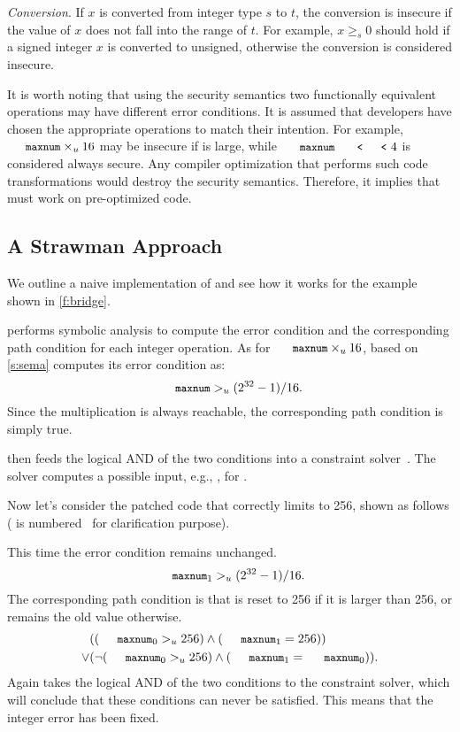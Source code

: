 \noindent
{\it Conversion}.
If $x$ is converted from integer type $s$ to $t$, the conversion
is insecure if the value of $x$ does not fall into the range of
$t$.  For example, $x \geq_s 0$ should hold if a signed integer $x$
is converted to unsigned, otherwise the conversion is considered
insecure.

It is worth noting that using the security semantics two functionally
equivalent operations may have different error conditions.  It is
assumed that developers have chosen the appropriate operations to
match their intention.  For example, $\cc{maxnum}\times_u 16$ may
be insecure if  is large, while $\cc{maxnum} \shl 4$ is
considered always secure.  Any compiler optimization that performs
such code transformations would destroy the security semantics.
Therefore, it implies that \sys must work on pre-optimized code.

\subsection{A Strawman Approach}

We outline a naive implementation of \sys and see how it works
for the example shown in \autoref{f:bridge}.

\sys performs symbolic analysis to compute the error condition and
the corresponding path condition for each integer operation.  As
for $\cc{maxnum} \times_u 16$, based on \autoref{s:sema}
\sys computes its error condition as:
\begin{equation*}
\cc{maxnum} >_u (2^{32} - 1) / 16.
\end{equation*}
Since the multiplication is always reachable, the corresponding
path condition is simply true.

\sys then feeds the logical AND of the two conditions into a
constraint solver~\cite{boolector}.  The solver computes a possible
input, e.g., , for .

Now let's consider the patched code that correctly limits 
to 256, shown as follows ( is
numbered~\cite[\chapterautorefname~8.11]{whale} for clarification
purpose).

This time the error condition remains unchanged.
\begin{equation*}
\cc{maxnum}_1 >_u (2^{32} - 1) / 16.
\end{equation*}
The corresponding path condition is that  is reset to 256
if it is larger than 256, or remains the old value otherwise.
\begin{align*}
& ((\cc{maxnum}_0 >_u 256) \land (\cc{maxnum}_1 = 256)) \\
\lor
& (\neg (\cc{maxnum}_0 >_u 256) \land (\cc{maxnum}_1 = \cc{maxnum}_0)).
\end{align*}
Again \sys takes the logical AND of the two conditions to the
constraint solver, which will conclude that these conditions can
never be satisfied.  This means that the integer error has been
fixed.

